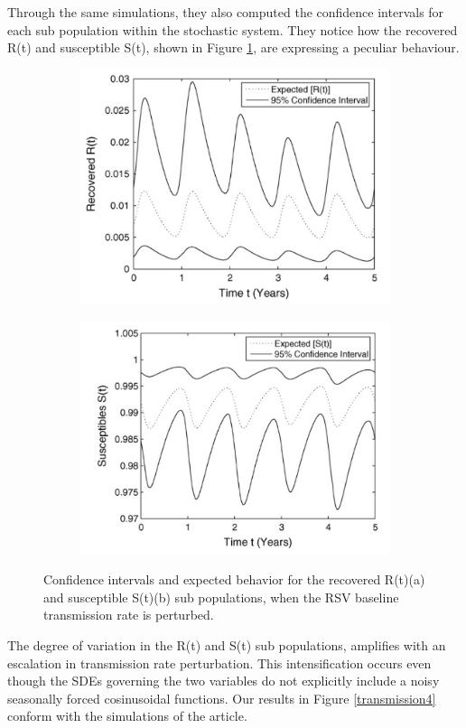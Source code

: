 Through the same simulations, they also computed the confidence intervals for each sub population within the stochastic system. They notice how the recovered R(t) and susceptible S(t), shown in Figure \ref{transmission3}, are expressing a peculiar behaviour.
\begin{figure}[h!]
    \centering
    \begin{subfigure}{0.4\textwidth}
        \includegraphics[width=\linewidth]{IMG/recovered_R(t).png}
        \caption{}
    \end{subfigure}
    \begin{subfigure}{0.4\textwidth}
        \includegraphics[width=\linewidth]{IMG/susceptible_S(t).png}
        \caption{}
    \end{subfigure}
    \caption{Confidence intervals and expected behavior for the recovered R(t)(a) and susceptible S(t)(b) sub populations, when the RSV baseline transmission rate is perturbed.}
    \label{transmission3}
\end{figure}
The degree of variation in the R(t) and S(t) sub populations, amplifies with an escalation in transmission rate perturbation. This intensification occurs even though the SDEs governing the two variables do not explicitly include a noisy seasonally forced cosinusoidal functions. Our results in Figure \ref{transmission4} conform with the simulations of the article. 

